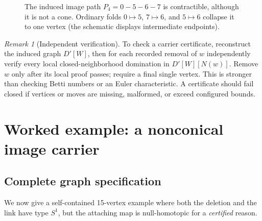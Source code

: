 \documentclass[11pt,letterpaper]{article}
\theoremstyle{definition}
\theoremstyle{remark}
\newtheorem{remark}[theorem]{Remark}
\newcommand{\N}{N}
\begin{document}
\begin{figure}[htbp]
\centering
{}
\caption{The induced image path \(P_4=0-5-6-7\) is contractible, although it is not a cone. Ordinary folds \(0\mapsto5\), \(7\mapsto6\), and \(5\mapsto6\) collapse it to one vertex (the schematic displays intermediate endpoints).}
\label{fig:path}
\end{figure}

\begin{remark}[Independent verification]
To check a carrier certificate, reconstruct the induced graph \(D'[W]\), then for each recorded removal of \(w\) independently verify every local closed-neighborhood domination in \(D'[W][\N(w)]\). Remove \(w\) only after its local proof passes; require a final single vertex. This is stronger than checking Betti numbers or an Euler characteristic. A certificate should fail closed if vertices or moves are missing, malformed, or exceed configured bounds.
\end{remark}

\section{Worked example: a nonconical image carrier}
\subsection{Complete graph specification}
We now give a self-contained 15-vertex example where both the deletion and the link have type \(S^1\), but the attaching map is null-homotopic for a \emph{certified} reason.
\end{document}
